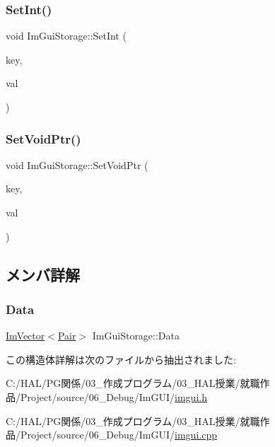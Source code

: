 \mbox{\label{struct_im_gui_storage_af83975ca841a9bd0e06a6ea0a41bf159}} 
\subsubsection{\texorpdfstring{Set\+Int()}{SetInt()}}
{\footnotesize\ttfamily void Im\+Gui\+Storage\+::\+Set\+Int (\begin{DoxyParamCaption}\item[{\mbox{\hyperlink{imgui_8h_a1785c9b6f4e16406764a85f32582236f}{Im\+Gui\+ID}}}]{key,  }\item[{int}]{val }\end{DoxyParamCaption})}

\mbox{\label{struct_im_gui_storage_a55f840086b3ec9cf63c67f02d159204a}} 
\subsubsection{\texorpdfstring{Set\+Void\+Ptr()}{SetVoidPtr()}}
{\footnotesize\ttfamily void Im\+Gui\+Storage\+::\+Set\+Void\+Ptr (\begin{DoxyParamCaption}\item[{\mbox{\hyperlink{imgui_8h_a1785c9b6f4e16406764a85f32582236f}{Im\+Gui\+ID}}}]{key,  }\item[{void $\ast$}]{val }\end{DoxyParamCaption})}



\subsection{メンバ詳解}
\mbox{\label{struct_im_gui_storage_aab0b9789fac598a34c500459259fde42}} 
\subsubsection{\texorpdfstring{Data}{Data}}
{\footnotesize\ttfamily \mbox{\hyperlink{class_im_vector}{Im\+Vector}}$<$\mbox{\hyperlink{struct_im_gui_storage_1_1_pair}{Pair}}$>$ Im\+Gui\+Storage\+::\+Data}



この構造体詳解は次のファイルから抽出されました\+:\begin{DoxyCompactItemize}
\item 
C\+:/\+H\+A\+L/\+P\+G関係/03\+\_\+作成プログラム/03\+\_\+\+H\+A\+L授業/就職作品/\+Project/source/06\+\_\+\+Debug/\+Im\+G\+U\+I/\mbox{\hyperlink{imgui_8h}{imgui.\+h}}\item 
C\+:/\+H\+A\+L/\+P\+G関係/03\+\_\+作成プログラム/03\+\_\+\+H\+A\+L授業/就職作品/\+Project/source/06\+\_\+\+Debug/\+Im\+G\+U\+I/\mbox{\hyperlink{imgui_8cpp}{imgui.\+cpp}}\end{DoxyCompactItemize}
